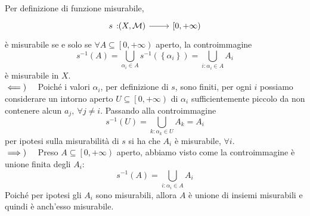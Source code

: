 \begin{demonstration}
	Per definizione di funzione misurabile,
	\begin{equation*}
		\funz{s}{\left(X,\mathcal{M}\right)}{\left[0,+\infty\right)}
	\end{equation*}
	è misurabile se e solo se $\forall A\subseteq\left[0,+\infty\right)$ aperto, la controimmagine
	\begin{equation*}
		s^{-1}\left(A\right)=\bigcup_{\alpha_i\in A}s^{-1}\left(\left\{\alpha_i\right\}\right)=\bigcup_{i\colon \alpha_i\in A}A_i
	\end{equation*}
è misurabile in $X$.\\
$\impliedby)\quad$ Poiché i valori $\alpha_i$, per definizione di $s$, sono finiti, per ogni $i$ possiamo considerare un intorno aperto $U\subseteq \left[0,+\infty\right)$ di $\alpha_i$ sufficientemente piccolo da non contenere alcun $a_j,\ \forall j\neq i$. Passando alla controimmagine
\begin{equation*}
	s^{-1}\left(U\right)=\bigcup_{k\colon \alpha_k\in U}A_k=A_i
\end{equation*}
per ipotesi sulla misurabilità di $s$ si ha che $A_i$ è misurabile, $\forall i$.\\
$\implies)\quad$ Preso $A\subseteq\left[0,+\infty\right)$ aperto, abbiamo visto come la controimmagine è unione finita degli $A_i$:
	\begin{equation*}
	s^{-1}\left(A\right)=\bigcup_{i\colon \alpha_i\in A}A_i
\end{equation*}
Poiché per ipotesi gli $A_i$ sono misurabili, allora $A$ è unione di insiemi misurabili e quindi è anch'esso misurabile.
\end{demonstration}
